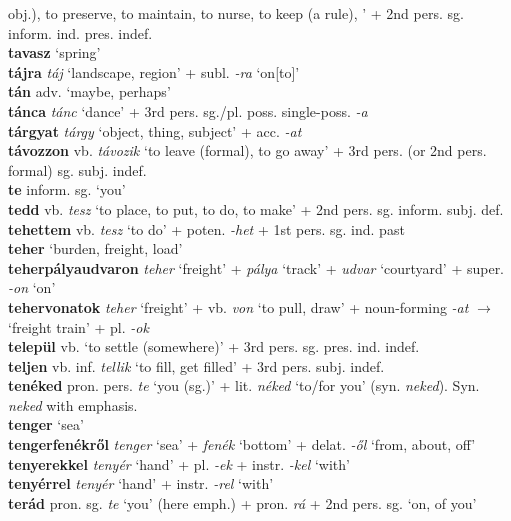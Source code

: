 \documentclass[11pt]{article}
\begin{document}
obj.), to preserve, to maintain, to nurse, to keep (a rule), ' + 2nd
pers. sg. inform. ind. pres. indef. \\
\textbf{tavasz} `spring' \\
\textbf{tájra} \emph{táj} `landscape, region' + subl. \emph{-ra}
`on[to]' \\
\textbf{tán} adv. `maybe, perhaps' \\
\textbf{tánca} \emph{tánc} `dance' + 3rd
pers. sg./pl. poss. single\hyp{}poss. \emph{-a} \\
\textbf{tárgyat} \emph{tárgy} `object, thing, subject' +
acc. \emph{-at} \\
\textbf{távozzon} vb. \emph{távozik} `to leave (formal), to go away' + 3rd
pers. (or 2nd pers. formal) sg. subj. indef. \\
\textbf{te} inform. sg. `you' \\
\textbf{tedd} vb. \emph{tesz} `to place, to put, to do, to make' + 2nd
pers. sg. inform. subj. def. \\
\textbf{tehettem} vb. \emph{tesz} `to do' + poten. \emph{-het} + 1st
pers. sg. ind. past \\
\textbf{teher} `burden, freight, load'\\
\textbf{teherpályaudvaron} \emph{teher} `freight' + \emph{pálya}
  `track' + \emph{udvar} `courtyard' + super. \emph{-on} `on' \\
\textbf{tehervonatok} \emph{teher} `freight' + vb. \emph{von} `to
pull, draw' + noun\hyp{}forming \emph{-at} $\rightarrow$ `freight train' +
pl. \emph{-ok} \\
\textbf{települ} vb. `to settle (somewhere)' + 3rd
pers. sg. pres. ind. indef. \\
\textbf{teljen} vb. inf. \emph{tellik} `to fill, get filled' + 3rd
pers. subj. indef. \\
\textbf{tenéked} pron. pers. \emph{te} `you (sg.)' + lit. \emph{néked}
`to/for you' (syn. \emph{neked}). Syn. \emph{neked} with emphasis. \\
\textbf{tenger} `sea' \\
\textbf{tengerfenékről} \emph{tenger} `sea' + \emph{fenék} `bottom' +
delat. \emph{-ől} `from, about, off' \\
\textbf{tenyerekkel} \emph{tenyér} `hand' + pl. \emph{-ek} +
instr. \emph{-kel} `with' \\
\textbf{tenyérrel} \emph{tenyér} `hand' + instr. \emph{-rel} `with' \\
\textbf{terád} pron. sg. \emph{te} `you' (here emph.) +
pron. \emph{rá} + 2nd pers. sg. `on, of you' \\
\end{document}
